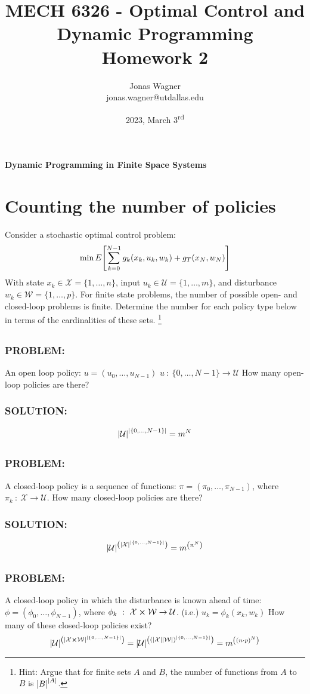 \documentclass[]{article}
\title{
    MECH 6326 - Optimal Control and Dynamic Programming \\ 
    Homework 2
}
\author{Jonas Wagner\\ jonas.wagner@utdallas.edu}
\date{2023, March 3\textsuperscript{rd}}
\newcommand{\Problem}{\subsubsection*{\textbf{PROBLEM:}}}
\newcommand{\Solution}{\subsubsection*{\textbf{SOLUTION:}}}
\newcommand{\st}{\ : \ }
\begin{document}
\maketitle

\tableofcontents

\newpage
\textbf{Dynamic Programming in Finite Space Systems}
\section{Counting the number of policies}
Consider a stochastic optimal control problem:
\[
    \min E\qty[\sum_{k=0}^{N-1} g_k(x_k,u_k,w_k) + g_T(x_N,w_N)]
\]
With state $x_k \in \mathcal{X} = \{1,\dots,n\}$, input $u_k \in \mathcal{U} = \{1,\dots,m\}$, and disturbance $w_k \in \mathcal{W}=\{1,\dots,p\}$.
For finite state problems, the number of possible open- and closed-loop problems is finite.
Determine the number for each policy type below in terms of the cardinalities of these sets.
\footnote{Hint: Argue that for finite sets $A$ and $B$, the number of functions from $A$ to $B$ is $\abs{B}^{\abs{A}}$.}

\subsection{}
\Problem
An open loop policy: 
$u = (u_0,\dots,u_{N-1})$
$u \st \{0,\dots,N-1\} \to \mathcal{U}$
How many open-loop policies are there?
\Solution
\[
    \abs{\mathcal{U}}^\abs{\{0,\dots, N-1\}} = m^N
\]

\subsection{}
\Problem
A closed-loop policy is a sequence of functions: 
$\pi = (\pi_0,\dots,\pi_{N-1})$, where $\pi_k \st \mathcal{X} \to \mathcal{U}$.
How many closed-loop policies are there?
\Solution
\[
    \abs{\mathcal{U}}^\qty(\abs{\mathcal{X}}^\abs{\{0,\dots,N-1\}}) = m^\qty(n^N)
\]

\subsection{}
\Problem
A closed-loop policy in which the disturbance is known ahead of time:
$\phi = (\phi_{0},\dots,\phi_{N-1})$, where $\phi_{k} \st \mathcal{X}\cross \mathcal{W} \to \mathcal{U}$.
(i.e.) $u_k = \phi_k(x_k,w_k)$
How many of these closed-loop policies exist?
\[
    \abs{\mathcal{U}}^\qty(\abs{\mathcal{X} \cross \mathcal{W}}^\abs{\{0,\dots,N-1\}})
    = \abs{\mathcal{U}}^\qty(\qty(\abs{\mathcal{X}} \abs{\mathcal{W}})^\abs{\{0,\dots,N-1\}})
    = m^\qty((n\cdot p)^N)
\]
\end{document}
